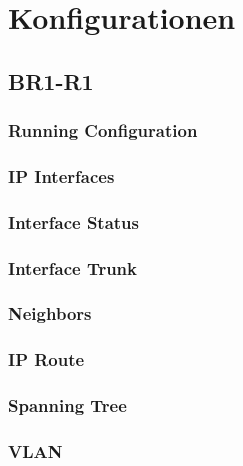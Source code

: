 \appendix

\section{Konfigurationen}
\label{appendix:configurations}

\subsection{BR1-R1}
\subsubsection{Running Configuration}


\subsubsection{IP Interfaces}


\subsubsection{Interface Status}


\subsubsection{Interface Trunk}


\subsubsection{Neighbors}


\subsubsection{IP Route}


\subsubsection{Spanning Tree}


\subsubsection{VLAN}





